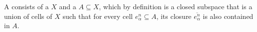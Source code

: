 \begin{definition} \label{definition:CW_pair}
A  consists of a  $X$ and a  $A \subseteq X$, which by definition is a closed subspace that is a union of cells of $X$ such that for every cell $e_{\alpha}^n \subseteq A$, its closure $\overline{e_{\alpha}^n}$ is also contained in $A$. 
\end{definition}